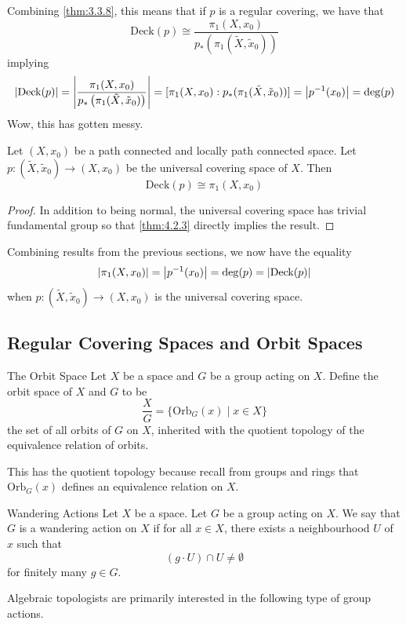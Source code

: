 \documentclass[a4paper]{article}
\begin{document}
Combining \ref{thm:3.3.8}, this means that if $p$ is a regular covering, we have that $$\text{Deck}(p)\cong\frac{\pi_1(X,x_0)}{p_\ast\left(\pi_1(\tilde{X},\tilde{x}_0)\right)}$$ implying $$\abs{\text{Deck}(p)}=\abs{\frac{\pi_1(X,x_0)}{p_\ast\left(\pi_1(\tilde{X},\tilde{x}_0)\right)}}=[\pi_1(X,x_0):p_\ast(\pi_1(\tilde{X},\tilde{x}_0))]=\abs{p^{-1}(x_0)}=\deg(p)$$ Wow, this has gotten messy. 

\begin{crl}{}{} Let $(X,x_0)$ be a path connected and locally path connected space. Let $p:(\tilde{X},\tilde{x}_0)\to(X,x_0)$ be the universal covering space of $X$. Then $$\text{Deck}(p)\cong\pi_1(X,x_0)$$ \tcbline
\begin{proof}
In addition to being normal, the universal covering space has trivial fundamental group so that \ref{thm:4.2.3} directly implies the result. 
\end{proof}
\end{crl}

Combining results from the previous sections, we now have the equality $$\abs{\pi_1(X,x_0)}=\abs{p^{-1}(x_0)}=\deg(p)=\abs{\text{Deck}(p)}$$ when $p:(\tilde{X},\tilde{x}_0)\to(X,x_0)$ is the universal covering space. 

\subsection{Regular Covering Spaces and Orbit Spaces}
\begin{defn}{The Orbit Space}{} Let $X$ be a space and $G$ be a group acting on $X$. Define the orbit space of $X$ and $G$ to be $$\frac{X}{G}=\{\text{Orb}_G(x)\;|\; x\in X\}$$ the set of all orbits of $G$ on $X$, inherited with the quotient topology of the equivalence relation of orbits. 
\end{defn}

This has the quotient topology because recall from groups and rings that $\text{Orb}_G(x)$ defines an equivalence relation on $X$. 

\begin{defn}{Wandering Actions}{} Let $X$ be a space. Let $G$ be a group acting on $X$. We say that $G$ is a wandering action on $X$ if for all $x\in X$, there exists a neighbourhood $U$ of $x$ such that $$(g\cdot U)\cap U\neq\emptyset$$ for finitely many $g\in G$. 
\end{defn}

Algebraic topologists are primarily interested in the following type of group actions. 
\end{document}
